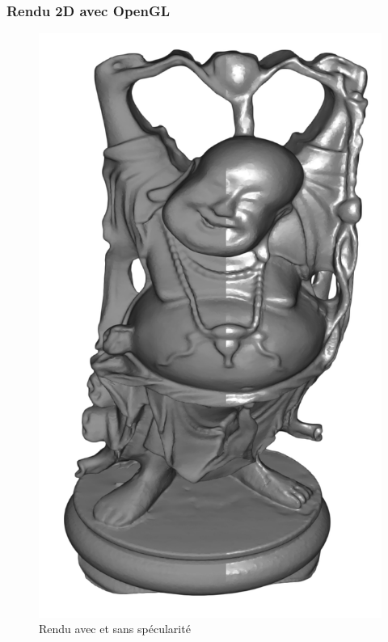 \documentclass{beamer}
\begin{document}
\begin{frame}
\frametitle{Rendu 2D avec OpenGL}
\begin{figure}
\centering
\includegraphics[scale=0.15]{rendu_specular.png}
\caption{Rendu avec et sans spécularité}
\end{figure}

\end{frame}
\end{document}
